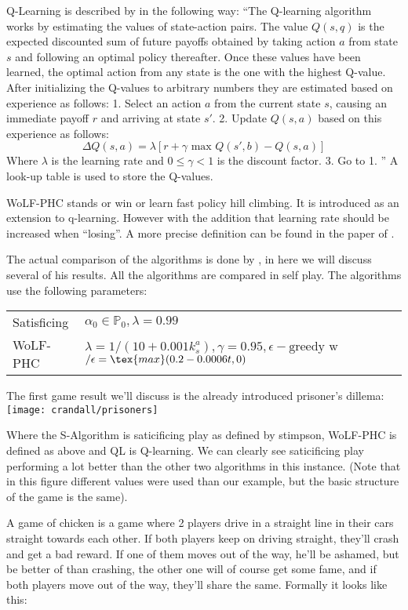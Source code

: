 Q-Learning is described by \citep{sandholm} in the following way: ``The
Q-learning algorithm works by estimating the values of state-action pairs. The
value $Q(s,q)$ is the expected discounted sum of future payoffs obtained by taking
action $a$ from state $s$ and following an optimal policy thereafter.
Once these values have been learned, the optimal action from any state
is the one with the highest Q-value. After initializing the Q-values to arbitrary
numbers they are estimated based on experience as follows: 1. Select an action
$a$ from the current state $s$, causing an immediate payoff $r$ and arriving at
state $s'$. 2. Update $Q(s,a)$ based on this experience as follows:
\[\Delta Q(s,a) = \lambda[r+\gamma \text{ max }Q(s',b)-Q(s,a)]\]
Where $\lambda$ is the learning rate and $0 \leq \gamma < 1$ is the discount
factor.
3. Go to 1.
'' A look-up table is used to store the Q-values.

WoLF-PHC stands or win or learn fast policy hill climbing. It is 
introduced as an extension to q-learning. However with the addition that
learning rate should be increased when ``losing''. A more precise definition
can be found in the paper of \citep{bowling}.

The actual comparison of the algorithms is done by \citep{crandall}, in here
we will discuss several of his results. All the algorithms are compared in self
play. The algorithms use the following parameters:

\begin{tabular}{ll}
  Satisficing & $\alpha_0\in \mathbb{P}_0, \lambda=0.99$ \\
  WoLF-PHC & $\lambda=1/(10+0.001 k^a_s), \gamma = 0.95, \epsilon-\text{greedy w}$ 
             $/\epsilon = \tex{max}(0.2-0.0006t,0)$ \\
\end{tabular}

The first game result we'll discuss
is the already introduced prisoner's dillema:
\texttt{[image: crandall/prisoners]}

Where the S-Algorithm is saticificing play as defined by stimpson, WoLF-PHC is
defined as above and QL is Q-learning. We can clearly see saticificing play
performing a lot better than the other two algorithms in this instance.
(Note that in this figure different values were used than our example, but
the basic structure of the game is the same).

A game of chicken is a game where 2 players drive in a straight line in their
cars straight towards each other. If both players keep on driving straight,
they'll crash and get a bad reward. If one of them moves out of the way, he'll
be ashamed, but be better of than crashing, the other one will of course get
some fame, and if both players move out of the way, they'll share the same.
Formally it looks like this:

